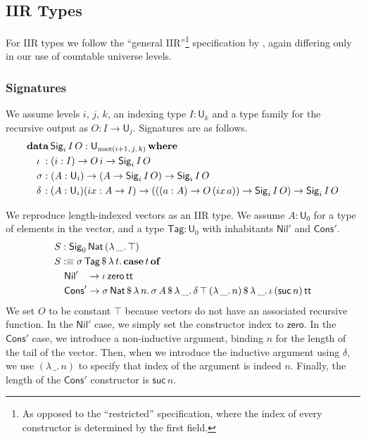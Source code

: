 \documentclass[acmsmall,screen,review,anonymous]{acmart}
\newcommand{\msf}[1]{{\mathsf{#1}}}
\newcommand{\mbf}[1]{{\mathbf{#1}}}
\newcommand{\data}{\mbf{data}}
\newcommand{\U}{\msf{U}}
\newcommand{\where}{\mbf{where}}
\newcommand{\Nat}{\msf{Nat}}
\newcommand{\zero}{\msf{zero}}
\newcommand{\suc}{\msf{suc}}
\newcommand{\Nil}{\msf{Nil}}
\newcommand{\Cons}{\msf{Cons}}
\newcommand{\Sig}{\msf{Sig}}
\newcommand{\Tag}{\msf{Tag}}
\newcommand{\case}{\mbf{case}}
\newcommand{\of}{\mbf{of}}
\newcommand{\ttt}{\msf{tt}}
\newcommand{\ix}{{ix}}
\begin{document}
\subsection{IIR Types}\label{sec:iir}

For IIR types we follow the ``general IIR''\footnote{As opposed to the ``restricted'' specification,
where the index of every constructor is determined by the first field.} specification by
\citet{DBLP:journals/jlp/DybjerS06}, again differing only in our use of countable universe levels.

\subsubsection{Signatures}\label{sec:iir-signatures} We assume levels $i$, $j$, $k$, an indexing type $I : \U_k$ and a type family
for the recursive output as $O : I \to \U_j$. Signatures are as follows.
\begin{alignat*}{4}
  &\data\, \Sig_i\,I\,O : \U_{\max(i+1,\,j,\,k)}\,\where\\
  &\quad \iota\hspace{0.25em}  : (i : I) \to O\,i \to \Sig_i\,I\,O \\
  &\quad \sigma                : (A : \U_i) \to (A \to \Sig_i\,I\,O) \to \Sig_i\,I\,O \\
  &\quad \delta\hspace{0.1em}  : (A : \U_i)(\ix : A \to I) \to (((a : A) \to O\,(\ix\,a)) \to \Sig_i\,I\,O) \to \Sig_i\,I\,O
\end{alignat*}

\begin{example}\label{ex:vector} We reproduce length-indexed vectors as an IIR type. We assume $A : \U_0$ for a type of elements in the vector,
and a type $\Tag : \U_0$ with inhabitants $\Nil'$ and $\Cons'$.
\begin{alignat*}{4}
  & S : \Sig_0\,\Nat\,(\lambda\,\_.\,\top)\\
  & S :\equiv \sigma\,\Tag\,\$\,\lambda\,t.\,\case\,t\,\of \\
  & \quad \Nil'\hspace{0.85em} \to \iota\,\zero\,\ttt \\
  & \quad \Cons'\to \sigma\,\Nat\,\$\,\lambda\,n.\,\sigma\,A\,\$\,\lambda\,\_.\,\delta\,\top\,(\lambda\,\_.\,n)\,\$\,\lambda\,\_.\,\iota\,(\suc\,n)\,\ttt
\end{alignat*}
We set $O$ to be constant $\top$ because vectors do not have an associated recursive function. In
the $\Nil'$ case, we simply set the constructor index to $\zero$. In the $\Cons'$ case, we introduce
a non-inductive argument, binding $n$ for the length of the tail of the vector. Then, when we
introduce the inductive argument using $\delta$, we use $(\lambda\,\_.\,n)$ to specify that index of
the argument is indeed $n$. Finally, the length of the $\Cons'$ constructor is $\suc\,n$.
\end{example}
\end{document}
